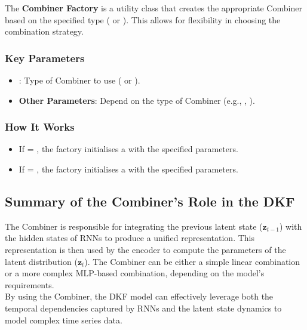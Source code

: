 The \textbf{Combiner Factory} is a utility class that creates the
appropriate Combiner based on the specified type ( or
). This allows for flexibility in choosing the combination
strategy.

\subsubsection*{Key Parameters}

\begin{itemize}
    \item {}: Type of Combiner to use 
    ( or ).
    \item \textbf{Other Parameters}: Depend on the type of Combiner 
    (e.g., , ).
\end{itemize}

\subsubsection*{How It Works}

\begin{itemize}
    \item If  = , the factory 
    initialises a  with the specified parameters.
    \item If  = , the factory initialises 
    a  with the specified parameters.
\end{itemize}
\subsection{Summary of the Combiner's Role in the DKF}

The Combiner is responsible for integrating the previous latent state
($\bm{z}_{t-1}$) with the hidden states of RNNs to produce a unified
representation. This representation is then used by the encoder to
compute the parameters of the latent distribution ($\bm{z}_{t}$).
The Combiner can be either a simple linear combination or a more complex
MLP-based combination, depending on the model's requirements.
\\
By using the Combiner, the DKF model can effectively leverage both the
temporal dependencies captured by RNNs and the latent state dynamics to
model complex time series data.
